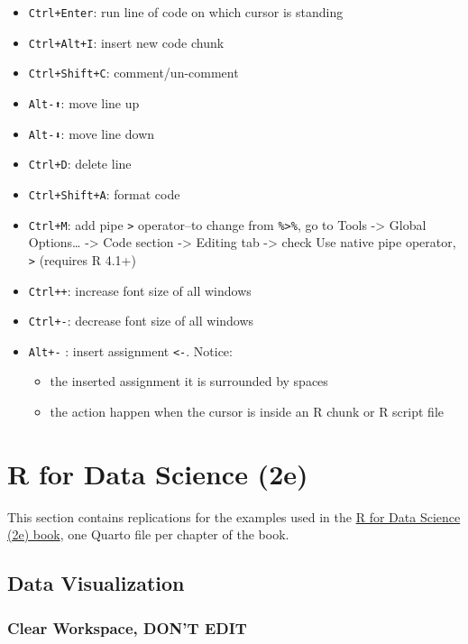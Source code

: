 \documentclass[
  letterpaper,
  DIV=11,
  numbers=noendperiod]{scrreprt}
\providecommand{\tightlist}{%
  \setlength{\itemsep}{0pt}\setlength{\parskip}{0pt}}\usepackage{longtable,booktabs,array}
\begin{document}
\begin{itemize}
\tightlist
\item
  \texttt{Ctrl+Enter}: run line of code on which cursor is standing
\item
  \texttt{Ctrl+Alt+I}: insert new code chunk
\item
  \texttt{Ctrl+Shift+C}: comment/un-comment
\item
  \texttt{Alt-⬆️}: move line up
\item
  \texttt{Alt-⬇️️}: move line down
\item
  \texttt{Ctrl+D}: delete line
\item
  \texttt{Ctrl+Shift+A}: format code
\item
  \texttt{Ctrl+M}: add pipe \texttt{\textbar{}\textgreater{}}
  operator--to change from \texttt{\%\textgreater{}\%}, go to Tools
  -\textgreater{} Global Options\ldots{} -\textgreater{} Code section
  -\textgreater{} Editing tab -\textgreater{} check Use native pipe
  operator, \texttt{\textbar{}\textgreater{}} (requires R 4.1+)
\item
  \texttt{Ctrl++}: increase font size of all windows
\item
  \texttt{Ctrl+-}: decrease font size of all windows
\item
  \texttt{Alt+-} : insert assignment \texttt{\textless{}-}. Notice:

  \begin{itemize}
  \tightlist
  \item
    the inserted assignment it is surrounded by spaces
  \item
    the action happen when the cursor is inside an R chunk or R script
    file
  \end{itemize}
\end{itemize}

\part{R for Data Science (2e)}

This section contains replications for the examples used in the
\href{https://r4ds.hadley.nz/}{R for Data Science (2e) book}, one Quarto
file per chapter of the book.

\chapter{Data Visualization}\label{data-visualization}

\section*{Clear Workspace, DON'T
EDIT}\label{clear-workspace-dont-edit-3}
\end{document}
